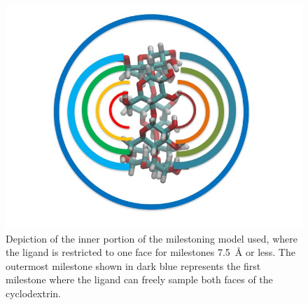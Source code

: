 \begin{figure}
	\includegraphics[width=\linewidth]{images/BCD_locked_image.jpg}
	\caption{Depiction of the inner portion of the milestoning model used, where the ligand is restricted to one face for milestones 7.5~{\AA} or less. The outermost milestone shown in dark blue represents the first milestone where the ligand can freely sample both faces of the cyclodextrin.}
	\label{fig:locked_image}
\end{figure}